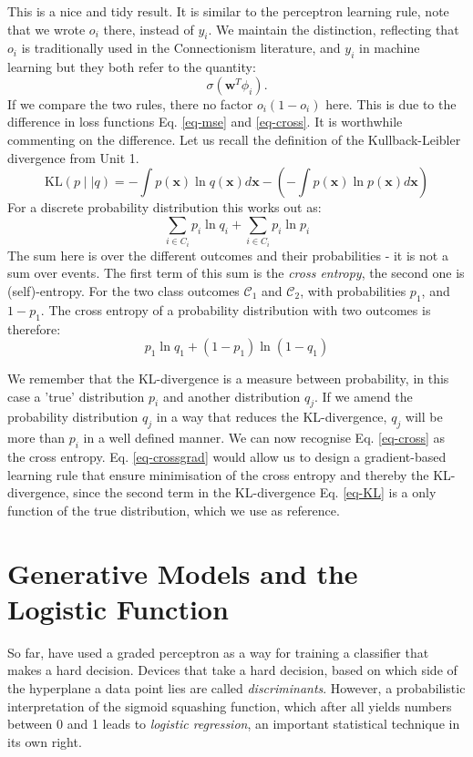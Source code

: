 This is a nice and tidy result. It is similar to the perceptron learning rule, note that we wrote $o_i$ there, instead of $y_i$. We maintain the distinction, reflecting
that $o_i$ is traditionally used in the Connectionism literature, and $y_i$ in machine learning but they both refer to the quantity:
$$
\sigma( \boldsymbol{w}^T \phi_i).
$$
If we compare the two rules, there no factor $o_i(1 - o_i)$ here. This is due to the difference in loss functions Eq. \ref{eq-mse} and \ref{eq-cross}.
It is worthwhile commenting on the difference. Let us recall the definition of the Kullback-Leibler divergence from Unit 1.
\begin{equation}
\mbox{KL}(p \mid \mid q) = - \int p (\boldsymbol{x}) \ln q (\boldsymbol{x} ) d \boldsymbol{x} -( - \int p(\boldsymbol{x}) \ln p( \boldsymbol{x}) d \boldsymbol{x})
\label{eq-KL}
\end{equation}
For a discrete probability distribution this works out as:
$$
\sum_{i \in C_i} p_i \ln q_i + \sum_{i \in C_i} p_i \ln p_i 
$$
The sum here is over the different outcomes and their probabilities - it is not a sum over events. The first term of this sum is the \emph{cross entropy}, the second
one is (self)-entropy. For the two class outcomes $\mathcal{C}_1$ and $\mathcal{C}_2$, with probabilities $p_1$, and $1-p_1$. The cross entropy of a probability distribution
with two outcomes is therefore:
$$
p_1 \ln q_1 + (1 - p_1) \ln (1 - q_1)
$$

We remember that the KL-divergence is a measure between probability, in this case a 'true' distribution $p_i$ and another distribution $q_j$. If we amend
the probability distribution $q_j$ in a way that reduces the KL-divergence, $q_j$ will be more than $p_i$ in a well defined manner. We can now recognise
Eq. \ref{eq-cross} as the cross entropy. Eq. \ref{eq-crossgrad} would allow us to design a gradient-based learning rule that ensure minimisation of the cross
entropy and thereby the KL-divergence, since the second term in the KL-divergence Eq. \ref{eq-KL} is a only function of the true distribution, which we use as reference.

  \section{Generative Models and the Logistic Function}
  \label{sec-generative}
  So far, have used a graded perceptron as a way for training a classifier that makes a hard decision. Devices that take a hard decision, based on
  which side of the hyperplane a data point lies are called \emph{discriminants}. However, a probabilistic interpretation of the sigmoid squashing function,
  which after all yields numbers between 0 and 1 leads to \emph{logistic regression}, an important statistical technique in its own right.


